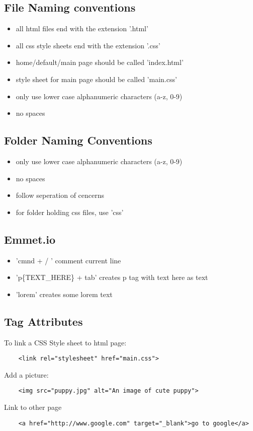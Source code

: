 \documentclass[]{article}
\begin{document}
\subsection{File Naming conventions}
	\begin{itemize}
		\item all html files end with the extension '.html'
		\item all css style sheets end with the extension '.css'
		\item home/default/main page should be called 'index.html'
		\item style sheet for main page should be called 'main.css'
		\item only use lower case alphanumeric characters (a-z, 0-9) 
		\item no spaces
	\end{itemize}
\subsection{Folder Naming Conventions}
	\begin{itemize}
		\item only use lower case alphanumeric characters (a-z, 0-9) 
		\item no spaces
		\item follow seperation of cencerns 
		\item for folder holding css files, use 'css'

	\end{itemize}

\subsection{Emmet.io}
	\begin{itemize}
		\item 'cmnd + / ' comment current line 
		\item 'p\{TEXT\_HERE\} + tab' creates p tag with text here as text 
		\item 'lorem' creates some lorem text
	\end{itemize}

\subsection{Tag Attributes}
	To link a CSS Style sheet to html page:
	\begin{lstlisting}
	<link rel="stylesheet" href="main.css">
	\end{lstlisting}
	Add a picture:
	\begin{lstlisting}
	<img src="puppy.jpg" alt="An image of cute puppy">
	\end{lstlisting}
	Link to other page
	\begin{lstlisting}
	<a href="http://www.google.com" target="_blank">go to google</a>
	\end{lstlisting}
	
\end{document}
